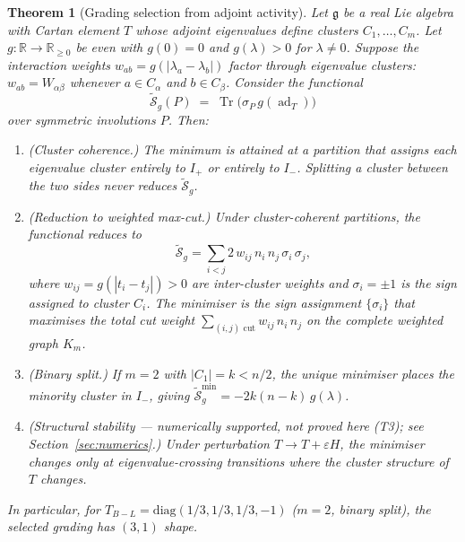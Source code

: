 \documentclass[11pt]{article}
\theoremstyle{plain}
\newtheorem{theorem}{Theorem}
\theoremstyle{definition}
\theoremstyle{remark}
\newcommand{\TBL}{T_{B\!-\!L}}
\newcommand{\ad}{\operatorname{ad}}
\newcommand{\Tr}{\operatorname{Tr}}
\begin{document}
\begin{theorem}[Grading selection from adjoint activity]
\label{thm:selection}
Let $\mathfrak{g}$ be a real Lie algebra with Cartan element $T$
whose adjoint eigenvalues define clusters $C_1, \ldots, C_m$.
Let $g : \mathbb{R} \to \mathbb{R}_{\ge 0}$ be even with $g(0) = 0$
and $g(\lambda) > 0$ for $\lambda \ne 0$.  Suppose the interaction
weights $w_{ab} = g(|\lambda_a - \lambda_b|)$ \emph{factor through
eigenvalue clusters}: $w_{ab} = W_{\alpha\beta}$ whenever
$a \in C_\alpha$ and $b \in C_\beta$.  Consider the functional
\[
  \widetilde{\mathcal{S}}_g(P)
  \;=\;
  \Tr\bigl(\sigma_P\,g(\ad_T)\bigr)
\]
over symmetric involutions $P$.  Then:
\begin{enumerate}\itemsep2pt
  \item[(i)] \emph{(Cluster coherence.)}  The minimum is attained at
    a partition that assigns each eigenvalue cluster entirely to
    $I_+$ or entirely to $I_-$.  Splitting a cluster between the two
    sides never reduces $\widetilde{\mathcal{S}}_g$.
  \item[(ii)] \emph{(Reduction to weighted max-cut.)}  Under
    cluster-coherent partitions, the functional reduces to
    \begin{equation}\label{eq:weighted-cut}
      \widetilde{\mathcal{S}}_g
      = \sum_{i < j} 2\,w_{ij}\,n_i\,n_j\,\sigma_i\,\sigma_j,
    \end{equation}
    where $w_{ij} = g(|t_i - t_j|) > 0$ are inter-cluster weights
    and $\sigma_i = \pm 1$ is the sign assigned to cluster $C_i$.
    The minimiser is the sign assignment $\{\sigma_i\}$ that maximises
    the total cut weight $\sum_{(i,j) \text{ cut}} w_{ij}\,n_i\,n_j$
    on the complete weighted graph $K_m$.
  \item[(iii)] \emph{(Binary split.)}  If $m = 2$ with
    $|C_1| = k < n/2$, the unique minimiser places the minority
    cluster in $I_-$, giving
    $\widetilde{\mathcal{S}}_g^{\min} = -2k(n{-}k)\,g(\lambda)$.
  \item[(iv)] \emph{(Structural stability --- numerically supported,
    not proved here (T3); see Section~\ref{sec:numerics}.)}  Under
    perturbation $T \to T + \varepsilon H$, the minimiser changes only at
    eigenvalue-crossing transitions where the cluster structure of
    $T$ changes.
\end{enumerate}
In particular, for $\TBL = \mathrm{diag}(1/3,1/3,1/3,-1)$ ($m = 2$,
binary split), the selected grading has $(3,1)$ shape.
\end{theorem}
\end{document}
